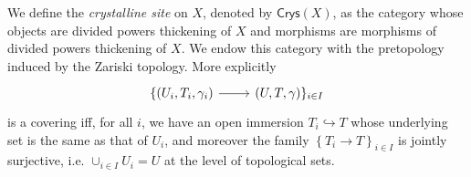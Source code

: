 \documentclass[../Main]{subfiles}
\begin{document}
\begin{defn}
	We define the {\em crystalline site} on $X$, denoted by $\mathsf{Crys}(X)$,
	as the category whose objects are divided powers thickening of $X$
	and morphisms are morphisms of divided powers thickening of $X$.
	We endow this category with the pretopology induced by the
	Zariski topology.
	More explicitly 
	\begin{equation*}
	\begin{tikzcd}
		\{ \left(U_i, T_i, \gamma_i\right)
		\arrow[r, "", rightarrow] &
	\left(U, T, \gamma\right) \}_{i \in I}
	\end{tikzcd}
	\end{equation*}
	is a covering iff, for all $i$, we have an open immersion
	$T_i \hookrightarrow T$ whose underlying set is the same as
	that of $U_i$, and moreover the family $\left\{ T_i \to T \right\}_{i \in I}$
	is jointly surjective, i.e. $\cup_{i \in I} U_i = U$ at
	the level of topological sets.
\end{defn}
\end{document}
